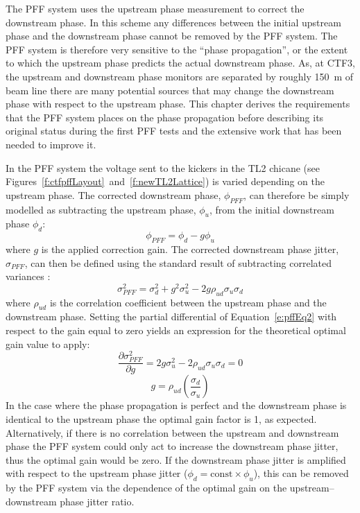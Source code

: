 
The PFF system uses the upstream phase measurement to correct the downstream phase. In this scheme any differences between the initial upstream phase and the downstream phase cannot be removed by the PFF system. The PFF system is therefore very sensitive to the ``phase propagation'', or the extent to which the upstream phase predicts the actual downstream phase. As, at CTF3, the upstream and downstream phase monitors are separated by roughly 150~m of beam line there are many potential sources that may change the downstream phase with respect to the upstream phase. This chapter derives the requirements that the PFF system places on the phase propagation before describing its original status during the first PFF tests and the extensive work that has been needed to improve it.


In the PFF system the voltage sent to the kickers in the TL2 chicane (see Figures~\ref{f:ctfpffLayout}~and~\ref{f:newTL2Lattice}) is varied depending on the upstream phase. The corrected downstream phase, \(\phi_{PFF}\), can therefore be simply modelled as subtracting the upstream phase, \(\phi_u\), from the initial downstream phase \(\phi_d\):
\begin{equation}
\phi_{PFF} = \phi_d - g\phi_u
\label{e:pffEq1}
\end{equation}
where \(g\) is the applied correction gain. The corrected downstream phase jitter, \(\sigma_{PFF}\), can then be defined using the standard result of subtracting correlated variances \cite{sumVar}:
\begin{equation}
\sigma_{PFF}^2 = \sigma_d^2 + g^2\sigma_u^2 - 2g\rho_{ud}\sigma_u\sigma_d
\label{e:pffEq2}
\end{equation}
where \(\rho_{ud}\) is the correlation coefficient between the upstream phase and the downstream phase. Setting the partial differential of Equation~\ref{e:pffEq2} with respect to the gain equal to zero yields an expression for the theoretical optimal gain value to apply:
\begin{equation}
\frac{\partial \sigma_{PFF}^2}{\partial g} = 2g\sigma_u^2 - 2\rho_{ud}\sigma_u\sigma_d = 0
\end{equation}
\begin{equation}
g = \rho_{ud}\left(\frac{\sigma_d}{\sigma_u}\right)
\label{e:theoretOptGain}
\end{equation}
In the case where the phase propagation is perfect and the downstream phase is identical to the upstream phase the optimal gain factor is 1, as expected. Alternatively, if there is no correlation between the upstream and downstream phase the PFF system could only act to increase the downstream phase jitter, thus the optimal gain would be zero. If the downstream phase jitter is amplified with respect to the upstream phase jitter (\(\phi_d = \mathrm{const}\times\phi_u\)), this can be removed by the PFF system via the dependence of the optimal gain on the upstream--downstream phase jitter ratio.

